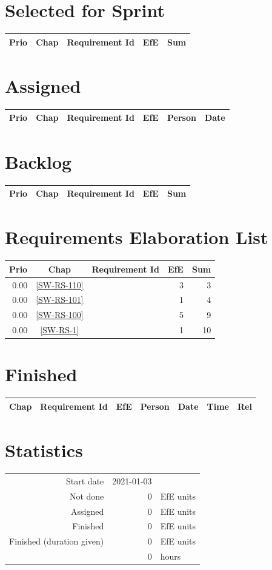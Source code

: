 \section{Selected for Sprint}
\begin{longtable}{|r|c|p{7cm}||r|r|} \hline
\textbf{Prio} & \textbf{Chap} & \textbf{Requirement Id} & \textbf{EfE} & \textbf{Sum} \\ \hline\endhead
\end{longtable}\section{Assigned}
\begin{longtable}{|r|c|p{6.5cm}||r|l|l|} \hline
\textbf{Prio} & \textbf{Chap} & \textbf{Requirement Id} & \textbf{EfE} & \textbf{Person} & \textbf{Date} \\ \hline\endhead
\end{longtable}\section{Backlog}
\begin{longtable}{|r|c|p{7cm}||r|r|} \hline
\textbf{Prio} & \textbf{Chap} & \textbf{Requirement Id} & \textbf{EfE} & \textbf{Sum} \\ \hline\endhead
\end{longtable}\section{Requirements Elaboration List}
\begin{longtable}{|r|c|p{7cm}||r|r|} \hline
\textbf{Prio} & \textbf{Chap} & \textbf{Requirement Id} & \textbf{EfE} & \textbf{Sum} \\ \hline\endhead
0.00 & \ref{SW-RS-110} & \nameref{SW-RS-110} & 3 & 3 \\ \hline
0.00 & \ref{SW-RS-101} & \nameref{SW-RS-101} & 1 & 4 \\ \hline
0.00 & \ref{SW-RS-100} & \nameref{SW-RS-100} & 5 & 9 \\ \hline
0.00 & \ref{SW-RS-1} & \nameref{SW-RS-1} & 1 & 10 \\ \hline
\end{longtable}\section{Finished}
{\small \begin{longtable}{|c|p{5.5cm}||r|l|l|r|r|} \hline
\textbf{Chap} & \textbf{Requirement Id} & \textbf{EfE} & \textbf{Person} & \textbf{Date} & \textbf{Time} & \textbf{Rel} \\ \hline\endhead
\end{longtable}}\section{Statistics}
\begin{longtable}{rrl}
Start date & 2021-01-03 & \\ 
Not done & 0 & EfE units \\ 
Assigned & 0 & EfE units \\ 
Finished & 0 & EfE units \\ 
Finished (duration given) & 0 & EfE units \\ 
 & 0 & hours \\ 
\end{longtable}